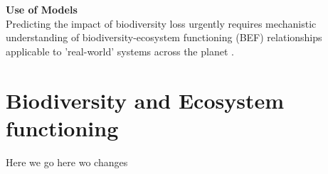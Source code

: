 \\\\
%
%
\textbf{Use of Models}\\
Predicting the impact of biodiversity loss urgently requires mechanistic understanding of biodiversity-ecosystem functioning (BEF) relationships applicable to 'real-world' systems across the planet \citep{Dobson2006,Estes2011}. 
%

\section{Biodiversity and Ecosystem functioning}
\label{chap:intro:biodiv}
Here we go  here wo changes